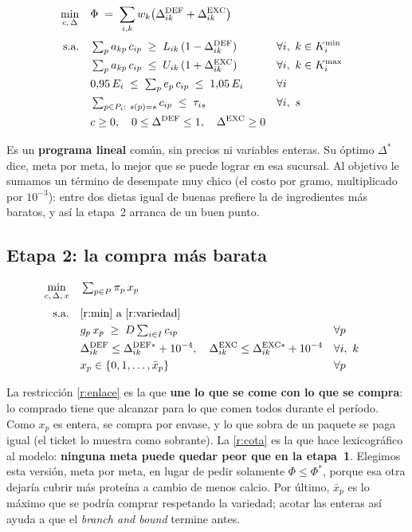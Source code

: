 \documentclass[10pt,a4paper]{article}
\newcommand{\Ddef}{\Delta^{\mathrm{DEF}}}
\newcommand{\Dexc}{\Delta^{\mathrm{EXC}}}
\begin{document}
\begin{align}
\min_{c,\,\Delta}\quad & \Phi \;=\; \sum_{i,k} w_k \bigl(\Ddef_{ik} + \Dexc_{ik}\bigr) \notag \\[2pt]
\text{s.a.}\quad
& \textstyle\sum_{p} a_{kp}\, c_{ip} \;\geq\; L_{ik}\,(1 - \Ddef_{ik}) && \forall i,\ k \in K_i^{\min} \label{r:min}\\
& \textstyle\sum_{p} a_{kp}\, c_{ip} \;\leq\; U_{ik}\,(1 + \Dexc_{ik}) && \forall i,\ k \in K_i^{\max} \label{r:max}\\
& 0{,}95\,E_i \;\leq\; \textstyle\sum_{p} e_p\, c_{ip} \;\leq\; 1{,}05\,E_i && \forall i \label{r:energia}\\
& \textstyle\sum_{p \in P_i:\ s(p) = s} c_{ip} \;\leq\; \tau_{is} && \forall i,\ s \label{r:variedad}\\
& c \geq 0,\quad 0 \leq \Ddef \leq 1,\quad \Dexc \geq 0 \notag
\end{align}

Es un \textbf{programa lineal} común, sin precios ni variables enteras. Su óptimo
$\Delta^\ast$ dice, meta por meta, lo mejor que se puede lograr en esa sucursal. Al
objetivo le sumamos un término de desempate muy chico (el costo por gramo,
multiplicado por $10^{-3}$): entre dos dietas igual de buenas prefiere la de
ingredientes más baratos, y así la etapa~2 arranca de un buen punto.

\subsection{Etapa 2: la compra más barata}

\begin{align}
\min_{c,\,\Delta,\,x}\quad & \textstyle\sum_{p \in P} \pi_p\, x_p \notag \\[2pt]
\text{s.a.}\quad
& \text{\eqref{r:min} a \eqref{r:variedad}} \notag \\
& g_p\, x_p \;\geq\; D \textstyle\sum_{i \in I} c_{ip} && \forall p \label{r:enlace}\\
& \Ddef_{ik} \leq \Delta^{\mathrm{DEF}\ast}_{ik} + 10^{-4},\quad \Dexc_{ik} \leq \Delta^{\mathrm{EXC}\ast}_{ik} + 10^{-4} && \forall i,\ k \label{r:cota}\\
& x_p \in \{0, 1, \dots, \bar{x}_p\} && \forall p \label{r:entera}
\end{align}

La restricción \eqref{r:enlace} es la que \textbf{une lo que se come con lo que se
compra}: lo comprado tiene que alcanzar para lo que comen todos durante el período.
Como $x_p$ es entera, se compra por envase, y lo que sobra de un paquete se paga
igual (el ticket lo muestra como sobrante). La \eqref{r:cota} es la que hace
lexicográfico al modelo: \textbf{ninguna meta puede quedar peor que en la etapa~1}.
Elegimos esta versión, meta por meta, en lugar de pedir solamente
$\Phi \leq \Phi^\ast$, porque esa otra dejaría cubrir más proteína a cambio de menos
calcio. Por último, $\bar{x}_p$ es lo máximo que se podría comprar respetando la
variedad; acotar las enteras así ayuda a que el \emph{branch and bound} termine
antes.
\end{document}
